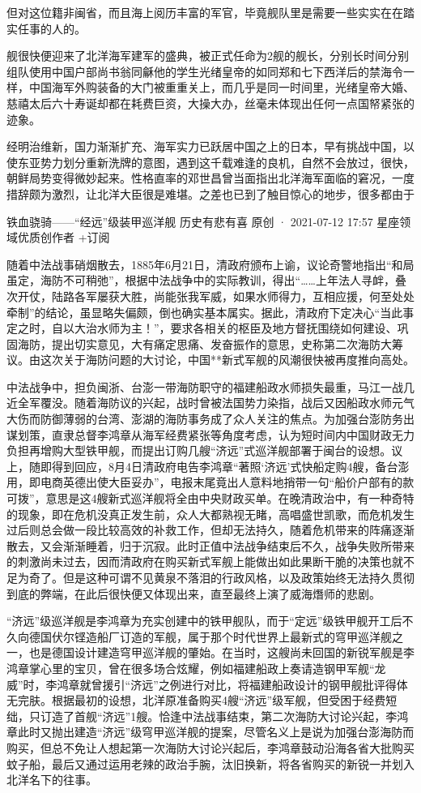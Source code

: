 \documentclass[12pt,UTF8]{ctexbook}
\begin{document}
但对这位籍非闽省，而且海上阅历丰富的军官，毕竟舰队里是需要一些实实在在踏实任事的人的。

舰很快便迎来了北洋海军建军的盛典，被正式任命为2舰的舰长，分别长时间分别组队使用中国户部尚书翁同龢他的学生光绪皇帝的如同郑和七下西洋后的禁海令一样，中国海军外购装备的大门被重重关上，而几乎是同一时间里，光绪皇帝大婚、慈禧太后六十寿诞却都在耗费巨资，大操大办，丝毫未体现出任何一点国帑紧张的迹象。

经明治维新，国力渐渐扩充、海军实力已跃居中国之上的日本，早有挑战中国，以使东亚势力划分重新洗牌的意图，遇到这千载难逢的良机，自然不会放过，很快，朝鲜局势变得微妙起来。性格直率的邓世昌曾当面指出北洋海军面临的窘况，一度措辞颇为激烈，让北洋大臣很是难堪。之差也已到了触目惊心的地步，很多都由于

铁血骁骑——“经远”级装甲巡洋舰
历史有悲有喜
原创 ·  2021-07-12 17:57
星座领域优质创作者
+订阅

随着中法战事硝烟散去，1885年6月21日，清政府颁布上谕，议论奇警地指出“和局虽定，海防不可稍弛”，根据中法战争中的实际教训，得出“……上年法人寻衅，叠次开仗，陆路各军屡获大胜，尚能张我军威，如果水师得力，互相应援，何至处处牵制”的结论，虽显略失偏颇，倒也确实基本属实。据此，清政府下定决心“当此事定之时，自以大治水师为主！”，要求各相关的枢臣及地方督抚围绕如何建设、巩固海防，提出切实意见，大有痛定思痛、发奋振作的意思，史称第二次海防大筹议。由这次关于海防问题的大讨论，中国**新式军舰的风潮很快被再度推向高处。

中法战争中，担负闽浙、台澎一带海防职守的福建船政水师损失最重，马江一战几近全军覆没。随着海防议的兴起，战时曾被法国势力染指，战后又因船政水师元气大伤而防御薄弱的台湾、澎湖的海防事务成了众人关注的焦点。为加强台澎防务出谋划策，直隶总督李鸿章从海军经费紧张等角度考虑，认为短时间内中国财政无力负担再增购大型铁甲舰，而提出订购几艘“济远”式巡洋舰部署于闽台的设想。议上，随即得到回应，8月4日清政府电告李鸿章“著照‘济远’式快船定购4艘，备台澎用，即电商英德出使大臣妥办”，电报末尾竟出人意料地捎带一句“船价户部有的款可拨”，意思是这4艘新式巡洋舰将全由中央财政买单。在晚清政治中，有一种奇特的现象，即在危机没真正发生前，众人大都熟视无睹，高唱盛世凯歌，而危机发生过后则总会做一段比较高效的补救工作，但却无法持久，随着危机带来的阵痛逐渐散去，又会渐渐睡着，归于沉寂。此时正值中法战争结束后不久，战争失败所带来的刺激尚未过去，因而清政府在购买新式军舰上能做出如此果断干脆的决策也就不足为奇了。但是这种可谓不见黄泉不落泪的行政风格，以及政策始终无法持久贯彻到底的弊端，在此后很快便又体现出来，直至最终上演了威海熸师的悲剧。

“济远”级巡洋舰是李鸿章为充实创建中的铁甲舰队，而于“定远”级铁甲舰开工后不久向德国伏尔铿造船厂订造的军舰，属于那个时代世界上最新式的穹甲巡洋舰之一，也是德国设计建造穹甲巡洋舰的肇始。在当时，这艘尚未回国的新锐军舰是李鸿章掌心里的宝贝，曾在很多场合炫耀，例如福建船政上奏请造钢甲军舰“龙威”时，李鸿章就曾援引“济远”之例进行对比，将福建船政设计的钢甲舰批评得体无完肤。根据最初的设想，北洋原准备购买4艘“济远”级军舰，但受困于经费短绌，只订造了首舰“济远”1艘。恰逢中法战事结束，第二次海防大讨论兴起，李鸿章此时又抛出建造“济远”级穹甲巡洋舰的提案，尽管名义上是说为加强台澎海防而购买，但总不免让人想起第一次海防大讨论兴起后，李鸿章鼓动沿海各省大批购买蚊子船，最后又通过运用老辣的政治手腕，汰旧换新，将各省购买的新锐一并划入北洋名下的往事。
\end{document}

